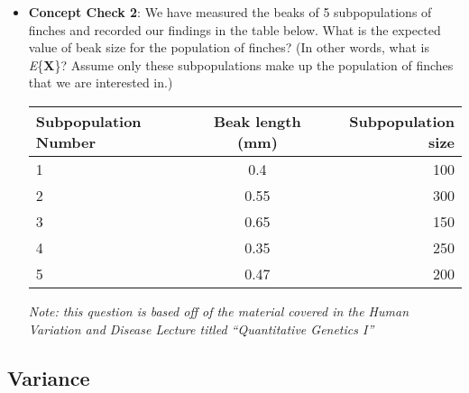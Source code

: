 \documentclass[12pt]{report}
\begin{document}
\begin{itemize}
\item \textbf{Concept Check 2}: We have measured the beaks of 5 subpopulations of finches and recorded our findings in the table below. What is the expected value of beak size for the population of finches? (In other words, what is \textit{E}\{\textbf{X}\}? Assume only these subpopulations make up the population of finches that we are interested in.) 

\bigskip
\begin{tabular}{| l | c | r |}
	\hline
 Subpopulation Number & Beak length (mm) & Subpopulation size \\ \hline
  1 & 0.4 & 100 \\
  2 & 0.55 &  300 \\
  3 & 0.65 & 150 \\ 
  4 & 0.35 &  250 \\
  5 & 0.47 & 200 \\  \hline
\end{tabular}

\bigskip

\bigskip

\bigskip

\bigskip

\bigskip

\bigskip

\bigskip

\bigskip
\textit{Note: this question is based off of the material covered in the Human Variation and Disease Lecture titled ``Quantitative Genetics I''}

\end{itemize}

\subsection{Variance}
\end{document}
